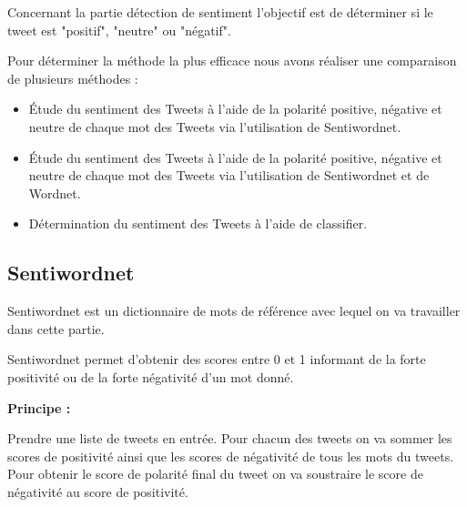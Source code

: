 \par Concernant la partie détection de sentiment l'objectif est de déterminer si le tweet est "positif", "neutre" ou "négatif".
\par Pour déterminer la méthode la plus efficace nous avons réaliser une comparaison de plusieurs méthodes :\\

\begin{itemize}
	\item Étude du sentiment des Tweets à l'aide de la polarité positive, négative et neutre de chaque mot des Tweets via l'utilisation de Sentiwordnet.
	\item Étude du sentiment des Tweets à l'aide de la polarité positive, négative et neutre de chaque mot des Tweets via l'utilisation de Sentiwordnet et de Wordnet.
	\item Détermination du sentiment des Tweets à l'aide de classifier.
\end{itemize}

\subsection{Sentiwordnet}
\par Sentiwordnet est un dictionnaire de mots de référence avec lequel on va travailler dans cette partie.
\par Sentiwordnet permet d'obtenir des scores entre 0 et 1 informant de la forte positivité ou de la forte négativité d'un mot donné. \\


\par \textbf{Principe :} \\
\par Prendre une liste de tweets en entrée. Pour chacun des tweets on va sommer les scores de positivité ainsi que les scores de négativité de tous les mots du tweets. Pour obtenir le score de polarité final du tweet on va soustraire le score de négativité au score de positivité. \\

